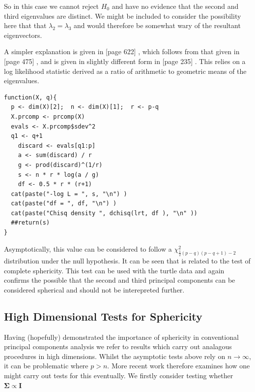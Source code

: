So in this case we cannot reject $H_{0}$ and have no evidence that the second and third eigenvalues are distinct.   We might be included to consider the possibility here that that $\lambda_{2} = \lambda_{3}$ and would therefore be somewhat wary of the resultant eigenvectors.


A simpler explanation is given in [page 622] \cite{Flury:1997}, which follows from that given in [page 475] \cite{Anderson:1984}, and is given in slightly different form in [page 235] \cite{Mardia+etal:1979}.%
This relies on a log likelihood statistic derived as a ratio of arithmetic to geometric means of the eigenvalues.

\singlespacing
\begin{verbatim}
function(X, q){
  p <- dim(X)[2];  n <- dim(X)[1];  r <- p-q
  X.prcomp <- prcomp(X)
  evals <- X.prcomp$sdev^2
  q1 <- q+1
    discard <- evals[q1:p]
    a <- sum(discard) / r
    g <- prod(discard)^(1/r)
    s <- n * r * log(a / g)
    df <- 0.5 * r * (r+1)
  cat(paste("-log L = ", s, "\n") )
  cat(paste("df = ", df, "\n") )
  cat(paste("Chisq density ", dchisq(lrt, df ), "\n" ))
  ##return(s)
}
\end{verbatim}
\onehalfspacing

Asymptotically, this value can be considered to follow a $\chi^{2}_{\frac{1}{2}(p-q)(p-q+1) - 2}$ distribution under the null hypothesis.   It can be seen that is related to the test of complete sphericity.   This test can be used with the turtle data and again confirms the possible that the second and third principal components can be considered spherical and should not be interepreted further.






\subsection{High Dimensional Tests for Sphericity}

Having (hopefully) demonstrated the importance of sphericity in conventional principal components analysis we refer to results which carry out analagous procedures in high dimensions.   Whilst the asymptotic tests above rely on $n \to \infty$, it can be problematic where $p > n$.   More recent work therefore examines how one might carry out tests for this eventually.   We firstly consider testing whether $\boldsymbol{\Sigma} \propto \boldsymbol{I}$ 

